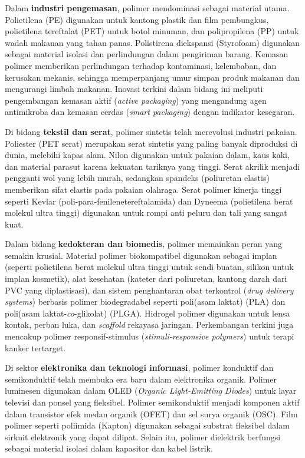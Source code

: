 \documentclass[12pt,a4paper,openany]{book}
\begin{document}
Dalam \textbf{industri pengemasan}, polimer mendominasi sebagai material utama. Polietilena (PE) digunakan untuk kantong plastik dan film pembungkus, polietilena tereftalat (PET) untuk botol minuman, dan polipropilena (PP) untuk wadah makanan yang tahan panas. Polistirena diekspansi (Styrofoam) digunakan sebagai material isolasi dan perlindungan dalam pengiriman barang. Kemasan polimer memberikan perlindungan terhadap kontaminasi, kelembaban, dan kerusakan mekanis, sehingga memperpanjang umur simpan produk makanan dan mengurangi limbah makanan. Inovasi terkini dalam bidang ini meliputi pengembangan kemasan aktif (\textit{active packaging}) yang mengandung agen antimikroba dan kemasan cerdas (\textit{smart packaging}) dengan indikator kesegaran.

Di bidang \textbf{tekstil dan serat}, polimer sintetis telah merevolusi industri pakaian. Poliester (PET serat) merupakan serat sintetis yang paling banyak diproduksi di dunia, melebihi kapas alam. Nilon digunakan untuk pakaian dalam, kaus kaki, dan material parasut karena kekuatan tariknya yang tinggi. Serat akrilik menjadi pengganti wol yang lebih murah, sedangkan spandeks (poliuretan elastis) memberikan sifat elastis pada pakaian olahraga. Serat polimer kinerja tinggi seperti Kevlar (poli-para-fenilenetereftalamida) dan Dyneema (polietilena berat molekul ultra tinggi) digunakan untuk rompi anti peluru dan tali yang sangat kuat.

Dalam bidang \textbf{kedokteran dan biomedis}, polimer memainkan peran yang semakin krusial. Material polimer biokompatibel digunakan sebagai implan (seperti polietilena berat molekul ultra tinggi untuk sendi buatan, silikon untuk implan kosmetik), alat kesehatan (kateter dari poliuretan, kantong darah dari PVC yang diplastisasi), dan sistem penghantaran obat terkontrol (\textit{drug delivery systems}) berbasis polimer biodegradabel seperti poli(asam laktat) (PLA) dan poli(asam laktat-\textit{co}-glikolat) (PLGA). Hidrogel polimer digunakan untuk lensa kontak, perban luka, dan \textit{scaffold} rekayasa jaringan. Perkembangan terkini juga mencakup polimer responsif-stimulus (\textit{stimuli-responsive polymers}) untuk terapi kanker tertarget.

Di sektor \textbf{elektronika dan teknologi informasi}, polimer konduktif dan semikonduktif telah membuka era baru dalam elektronika organik. Polimer luminesen digunakan dalam OLED (\textit{Organic Light-Emitting Diodes}) untuk layar televisi dan ponsel yang fleksibel. Polimer semikonduktif menjadi komponen aktif dalam transistor efek medan organik (OFET) dan sel surya organik (OSC). Film polimer seperti poliimida (Kapton) digunakan sebagai substrat fleksibel dalam sirkuit elektronik yang dapat dilipat. Selain itu, polimer dielektrik berfungsi sebagai material isolasi dalam kapasitor dan kabel listrik.
\end{document}
